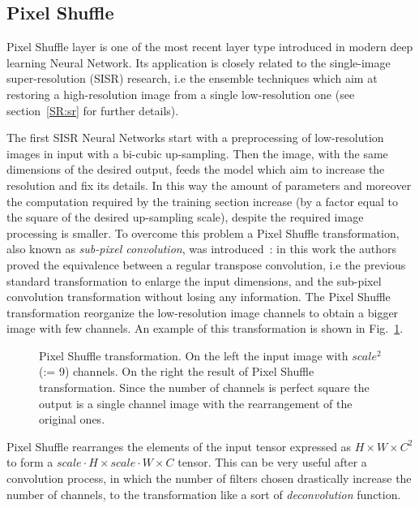 \documentclass{standalone}
\begin{document}

\subsection[Pixel Shuffle]{Pixel Shuffle}\label{NN:shuffler}

Pixel Shuffle layer is one of the most recent layer type introduced in modern deep learning Neural Network.
Its application is closely related to the single-image super-resolution (SISR) research, i.e the ensemble techniques which aim at restoring a high-resolution image from a single low-resolution one (see section~\ref{SR:sr} for further details).

The first SISR Neural Networks start with a preprocessing of low-resolution images in input with a bi-cubic up-sampling.
Then the image, with the same dimensions of the desired output, feeds the model which aim to increase the resolution and fix its details.
In this way the amount of parameters and moreover the computation required by the training section increase (by a factor equal to the square of the desired up-sampling scale), despite the required image processing is smaller.
To overcome this problem a Pixel Shuffle transformation, also known as \emph{sub-pixel convolution}, was introduced~\cite{Wenzhe2016Shuffle}: in this work the authors proved the equivalence between a regular transpose convolution, i.e the previous standard transformation to enlarge the input dimensions, and the sub-pixel convolution transformation without losing any information.
The Pixel Shuffle transformation reorganize the low-resolution image channels to obtain a bigger image with few channels.
An example of this transformation is shown in Fig.~\ref{fig:pixel_shuffle}.

\begin{figure}[htbp]
\centering
\def\svgwidth{0.7\textwidth}

\caption{Pixel Shuffle transformation.
On the left the input image with $scale^2$ (:= 9) channels.
On the right the result of Pixel Shuffle transformation.
Since the number of channels is perfect square the output is a single channel image with the rearrangement of the original ones.
}
\label{fig:pixel_shuffle}
\end{figure}

Pixel Shuffle rearranges the elements of the input tensor expressed as $H \times W \times C^2$ to form a $scale \cdot H \times scale \cdot W \times C$ tensor.
This can be very useful after a convolution process, in which the number of filters chosen drastically increase the number of channels, to  the transformation like a sort of \emph{deconvolution} function.
\end{document}
